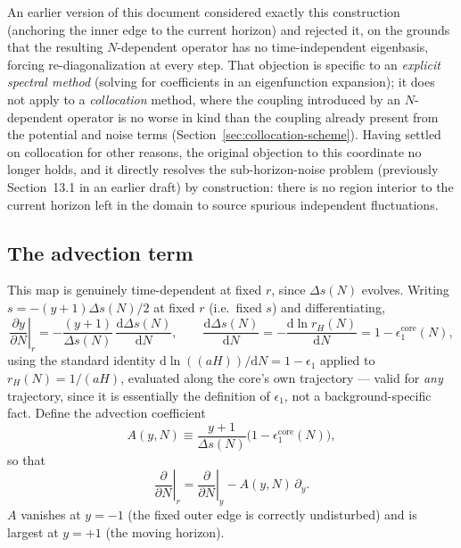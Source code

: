 \documentclass[a4paper,11pt]{article}
\newcommand{\semibold}[1]{{\fontseries{b}\selectfont{#1}}}
\renewcommand{\d}{\mathrm{d}}
\newenvironment{panel}{\begin{tcolorbox}[enhanced,breakable,colback=gray!10,colframe=gray!30]\small}{\end{tcolorbox}}
\newcommand{\Ny}{N}                          %
\newcommand{\epsSR}{\epsilon_1}              %
\newcommand{\Hub}{H}                         %
\newcommand{\sfactor}{a}                     %
\newcommand{\rad}{r}                         %
\newcommand{\yco}{y}                         %
\newcommand{\aH}[1][]{(\sfactor \Hub)#1}     %
\newcommand{\rH}{\rad_H}                     %
\newcommand{\Deltas}{\Delta s}                %
\newcommand{\epscore}{\epsSR^{\mathrm{core}}} %
\newcommand{\advcoef}{A}                     %
\begin{document}
\begin{panel}
\semibold{This was the previously-rejected alternative --- now viable.} An
earlier version of this document considered exactly this construction
(anchoring the inner edge to the current horizon) and rejected it, on the
grounds that the resulting $\Ny$-dependent operator has no time-independent
eigenbasis, forcing re-diagonalization at every step. That objection is
specific to an \emph{explicit spectral method} (solving for coefficients
in an eigenfunction expansion); it does not apply to a \emph{collocation}
method, where the coupling introduced by an $\Ny$-dependent operator is no
worse in kind than the coupling already present from the potential and
noise terms (Section~\ref{sec:collocation-scheme}). Having settled on
collocation for other reasons, the original objection to this coordinate
no longer holds, and it directly resolves the sub-horizon-noise problem
(previously Section~13.1 in an earlier draft) by construction: there is no
region interior to the current horizon left in the domain to source
spurious independent fluctuations.
\end{panel}

\subsection{The advection term}

This
map is genuinely time-dependent at fixed $\rad$, since $\Deltas(\Ny)$
evolves. Writing $s=-(\yco+1)\Deltas(\Ny)/2$ at fixed $\rad$ (i.e.\ fixed
$s$) and differentiating,
\begin{equation}
    \left.\frac{\partial \yco}{\partial \Ny}\right|_\rad
    =
    -\frac{(\yco+1)}{\Deltas(\Ny)}\,\frac{\d\Deltas(\Ny)}{\d\Ny} ,
    \qquad
    \frac{\d\Deltas(\Ny)}{\d\Ny} = -\frac{\d\ln\rH(\Ny)}{\d\Ny} = 1-\epscore(\Ny) ,
    \label{eq:Deltas-derivative}
\end{equation}
using the standard identity $\d\ln(\aH)/\d\Ny = 1-\epsSR$ applied to
$\rH(\Ny)=1/\aH$, evaluated along the core's own trajectory --- valid for
\emph{any} trajectory, since it is essentially the definition of
$\epsSR$, not a background-specific fact. Define the advection coefficient
\begin{equation}
    \advcoef(\yco,\Ny) \equiv \frac{\yco+1}{\Deltas(\Ny)}\big(1-\epscore(\Ny)\big) ,
\end{equation}
so that
\begin{equation}
    \left.\frac{\partial}{\partial \Ny}\right|_\rad
    =
    \left.\frac{\partial}{\partial \Ny}\right|_\yco
    -
    \advcoef(\yco,\Ny)\,\partial_\yco .
    \label{eq:advection-operator}
\end{equation}
$\advcoef$ vanishes at $\yco=-1$ (the fixed outer edge is correctly
undisturbed) and is largest at $\yco=+1$ (the moving horizon).
\end{document}
